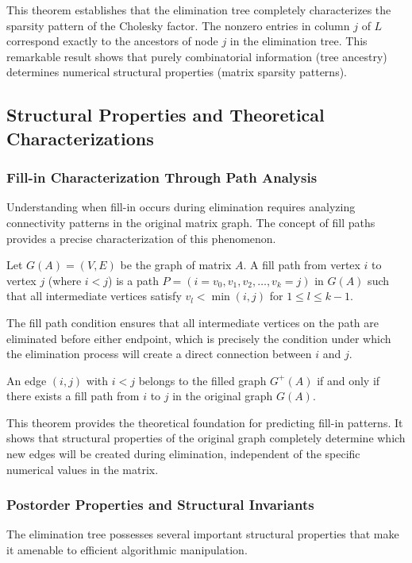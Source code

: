 This theorem establishes that the elimination tree completely characterizes the sparsity pattern of the Cholesky factor. The nonzero entries in column $j$ of $L$ correspond exactly to the ancestors of node $j$ in the elimination tree. This remarkable result shows that purely combinatorial information (tree ancestry) determines numerical structural properties (matrix sparsity patterns).

\subsection{Structural Properties and Theoretical Characterizations}

\subsubsection{Fill-in Characterization Through Path Analysis}
Understanding when fill-in occurs during elimination requires analyzing connectivity patterns in the original matrix graph. The concept of fill paths provides a precise characterization of this phenomenon.

\begin{definition}
Let $G(A) = (V, E)$ be the graph of matrix $A$. A fill path from vertex $i$ to vertex $j$ (where $i < j$) is a path $P = (i = v_0, v_1, v_2, \ldots, v_k = j)$ in $G(A)$ such that all intermediate vertices satisfy $v_l < \min(i,j)$ for $1 \leq l \leq k-1$.
\end{definition}

The fill path condition ensures that all intermediate vertices on the path are eliminated before either endpoint, which is precisely the condition under which the elimination process will create a direct connection between $i$ and $j$.

\begin{theorem}
An edge $(i,j)$ with $i < j$ belongs to the filled graph $G^+(A)$ if and only if there exists a fill path from $i$ to $j$ in the original graph $G(A)$.
\end{theorem}

This theorem provides the theoretical foundation for predicting fill-in patterns. It shows that structural properties of the original graph completely determine which new edges will be created during elimination, independent of the specific numerical values in the matrix.

\subsubsection{Postorder Properties and Structural Invariants}
The elimination tree possesses several important structural properties that make it amenable to efficient algorithmic manipulation.

